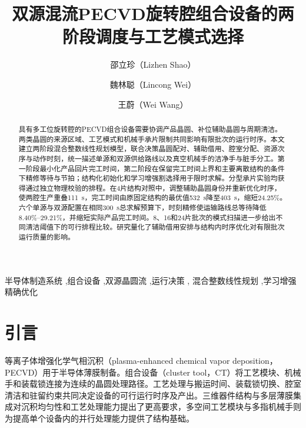\documentclass[final,5p,times,twocolumn]{elsarticle}
\begin{document}
\begin{frontmatter}

\title{双源混流PECVD旋转腔组合设备的两阶段调度与工艺模式选择}

\author[ustb]{邵立珍（Lizhen Shao）}
\author[ustb]{魏林聪（Lincong Wei）}
\author[ustb]{王蔚（Wei Wang）}

\address[ustb]{北京科技大学控制科学与工程系，北京市海淀区学院路30号，
北京100083，中国}

\begin{abstract}
具有多工位旋转腔的PECVD组合设备需要协调产品晶圆、补位辅助晶圆与周期清洁。两类晶圆的来源区域、工艺模式和机械手承片限制共同影响有限批次的运行时序。本文建立两阶段混合整数线性规划模型，联合决策晶圆配对、辅助借用、腔室分配、资源次序与动作时刻，统一描述单源和双源供给路线以及真空机械手的洁净手与脏手分工。第一阶段最小化产品回片完工时间，第二阶段在保留完工时间上界和主要离散结构的条件下精修等待与节拍；结构化初始化和学习增强割选择用于限时求解。分型承片实验均获得通过独立物理校验的排程。在4片结构对照中，调整辅助晶圆身份并重新优化时序，使两腔生产重叠111~s，完工时间由原固定结构的最优值532~s降至403~s，缩短24.25\%。六个单源与双源配置在相同300~s总求解预算下，时刻精修使运输路线总等待降低8.40\%--29.21\%，并缩短实际产品完工时间。8、16和24片批次的模式扫描进一步给出不同清洁阈值下的可行排程比较。研究量化了辅助借用安排与结构内时序优化对有限批次运行质量的影响。

\end{abstract}

\begin{keyword}
半导体制造系统 \sep 组合设备 \sep 双源晶圆流 \sep 运行决策 \sep
混合整数线性规划 \sep 学习增强精确优化
\end{keyword}

\end{frontmatter}
\section{引言}

等离子体增强化学气相沉积（plasma-enhanced chemical vapor deposition，PECVD）用于半导体薄膜制备。组合设备（cluster tool，CT）将工艺模块、机械手和装载锁连接为连续的晶圆处理路径。工艺处理与搬运时间、装载锁切换、腔室清洁和驻留约束共同决定设备的可行运行时序及产出\citep{pan2018survey}。三维器件结构与多层薄膜集成对沉积均匀性和工艺处理能力提出了更高要求\citep{appliedprecisioncvd}，多空间工艺模块与多指机械手则为提高单个设备内的并行处理能力提供了结构基础\citep{gu2024applied,gu2024multifinger}。
\end{document}
